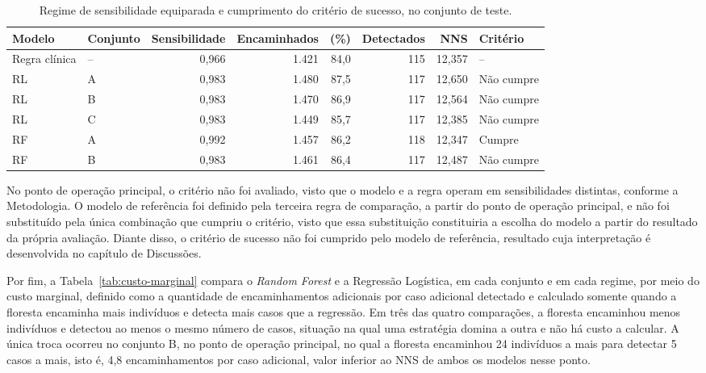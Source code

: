 \begin{table}[htb]
  \centering
  \caption{\label{tab:equiparado}Regime de sensibilidade equiparada e cumprimento do critério de sucesso, no conjunto de teste.}
  \footnotesize
  \setlength{\tabcolsep}{4pt}
  \begin{tabular}{llrrrrrl}
    \hline
    Modelo & Conjunto & Sensibilidade & Encaminhados & (\%) & Detectados & NNS & Critério \\ \hline
    Regra clínica & -- & 0,966 & 1.421 & 84,0 & 115 & 12,357 & -- \\
    RL & A & 0,983 & 1.480 & 87,5 & 117 & 12,650 & Não cumpre \\
    RL & B & 0,983 & 1.470 & 86,9 & 117 & 12,564 & Não cumpre \\
    RL & C & 0,983 & 1.449 & 85,7 & 117 & 12,385 & Não cumpre \\
    RF & A & 0,992 & 1.457 & 86,2 & 118 & 12,347 & Cumpre \\
    RF & B & 0,983 & 1.461 & 86,4 & 117 & 12,487 & Não cumpre \\ \hline
  \end{tabular}
\end{table}

No ponto de operação principal, o critério não foi avaliado, visto que o modelo e a regra operam em sensibilidades distintas, conforme a Metodologia. O modelo de referência foi definido pela terceira regra de comparação, a partir do ponto de operação principal, e não foi substituído pela única combinação que cumpriu o critério, visto que essa substituição constituiria a escolha do modelo a partir do resultado da própria avaliação. Diante disso, o critério de sucesso não foi cumprido pelo modelo de referência, resultado cuja interpretação é desenvolvida no capítulo de Discussões.

Por fim, a Tabela~\ref{tab:custo-marginal} compara o \textit{Random Forest} e a Regressão Logística, em cada conjunto e em cada regime, por meio do custo marginal, definido como a quantidade de encaminhamentos adicionais por caso adicional detectado e calculado somente quando a floresta encaminha mais indivíduos e detecta mais casos que a regressão. Em três das quatro comparações, a floresta encaminhou menos indivíduos e detectou ao menos o mesmo número de casos, situação na qual uma estratégia domina a outra e não há custo a calcular. A única troca ocorreu no conjunto B, no ponto de operação principal, no qual a floresta encaminhou 24 indivíduos a mais para detectar 5 casos a mais, isto é, 4,8 encaminhamentos por caso adicional, valor inferior ao NNS de ambos os modelos nesse ponto.


